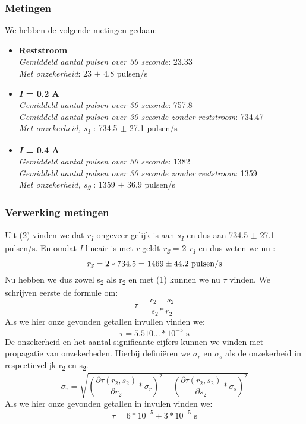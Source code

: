 \documentclass[a4paper]{article}
\begin{document}
\subsubsection{Metingen}
We hebben de volgende metingen gedaan:
\begin{itemize}
	\item \textbf{Reststroom}\\
    \textit{Gemiddeld aantal pulsen over 30 seconde}: 23.33\\
	\textit{Met onzekerheid}: 23 $\pm$ 4.8 pulsen/s
	\item \textbf{\textit{I} = 0.2 A}\\
	\textit{Gemiddeld aantal pulsen over 30 seconde}: 757.8\\
	\textit{Gemiddeld aantal pulsen over 30 seconde zonder reststroom}: 734.47\\
	\textit{Met onzekerheid, s\textsubscript{1}} : 734.5 $\pm$ 27.1 pulsen/s
	\item \textbf{\textit{I} = 0.4 A}\\
	\textit{Gemiddeld aantal pulsen over 30 seconde}: 1382\\
	\textit{Gemiddeld aantal pulsen over 30 seconde zonder reststroom}: 1359\\
	\textit{Met onzekerheid, s\textsubscript{2}} : 1359 $\pm$ 36.9 pulsen/s
\end{itemize}
\subsubsection{Verwerking metingen}
Uit (2) vinden we dat \textit{r\textsubscript{1}} ongeveer gelijk is aan \textit{s\textsubscript{1}} en dus aan 734.5 $\pm$ 27.1 pulsen/s. En omdat \textit{I} lineair is met \textit{r} geldt \textit{r\textsubscript{2}} = 2 \textit{r\textsubscript{1}} en dus weten we nu :\\
$$ 
\textit{r\textsubscript{2}} = 2 * 734.5 = 1469  \pm 44.2   \text{ pulsen/s}
$$
Nu hebben we dus zowel s\textsubscript{2} als r\textsubscript{2} en met (1) kunnen we nu $\tau$ vinden. We schrijven eerste de formule om:
 $$
 \tau = \frac{r_2 - s_2}{s_2*r_2}
 $$
 Als we hier onze gevonden getallen invullen vinden we:
 $$
 \tau = 5.510... *10^{-5} \text{ s}
 $$
 De onzekerheid en het aantal significante cijfers kunnen we vinden met propagatie van onzekerheden. Hierbij defini\"{e}ren we $\sigma_r$ en $\sigma_s$ als de onzekerheid in respectievelijk r\textsubscript{2} en s\textsubscript{2}.
 $$
 \sigma_\tau=\sqrt{\left(\frac{\partial{ \tau(r_2, s_2)}}{\partial{ r_2}}*\sigma_r\right)^2+\left(\frac{\partial{ \tau(r_2, s_2)}}{\partial{ s_2}}*\sigma_s\right)^2}
 $$
 Als we hier onze gevonden getallen in invulen vinden we: 
 $$
 \tau = 6* 10^{-5} \pm 3* 10^{-5} \text{ s}
 $$
 
\end{document}
